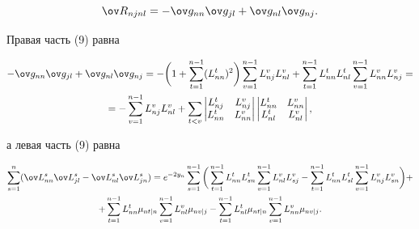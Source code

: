 \begin{pf}
\begin{equation}
\ov R_{njnl}=-\ov g_{nn} \ov g_{jl}+ \ov g_{nl} \ov g_{nj}.


\end{equation}





Правая часть (9) равна 


\begin{multline}


-\ov g_{nn} \ov g_{jl} + \ov g_{nl} \ov g_{nj}=


-\bigg(1+\sum_{t=1}^{n-1}(L^t_{nn})^2\bigg)\sum_{v=1}^{n-1}L_{nj}^vL^v_{nl}+


\sum_{t=1}^{n-1}L^t_{nn}L^t_{nl} \sum_{v=1}^{n-1}L^v_{nn}L^v_{nj}= \\


%


=-\sum_{v=1}^{n-1}L^v_{nj}L^v_{nl}+ 


\sum_{t<v}\begin{vmatrix} L^t_{nj} & L^v_{nj} \\


 L^t_{nn} & L^v_{nn} \end{vmatrix}


\begin{vmatrix} L^t_{nn} & L^v_{nn} \\ L^t_{nl} & L^v_{nl} \end{vmatrix},


\end{multline}


а левая часть (9) равна 


\begin{multline}


\sum_{s=1}^n(\ov L{}^s_{nn}\ov L{}^s_{jl}-\ov L{}^s_{nl}\ov L{}^s_{jn})=


e^{-2y_n}\sum^{n-1}_{s=1}\bigg(\sum^{n-1}_{t=1}


L^t_{nn}L^t_{sn}\sum^{n-1}_{v=1}L^v_{nl}L^v_{sj}


-\sum^{n-1}_{t=1}L^t_{nn}L^t_{sl}\sum^{n-1}_{v=1}L^v_{nj}


L^v_{sn}\bigg)+ \\


%


+\sum^{n-1}_{t=1}L^t_{nn}\mu_{nt|n}\sum^{n-1}_{v=1}


L^v_{nl}\mu_{nv|j}-\sum^{n-1}_{t=1}L^t_{nl}\mu_{nt|n}


\sum^{n-1}_{v=1}L^v_{nn}\mu_{nv|j}.


\end{multline}



\end{pf}
